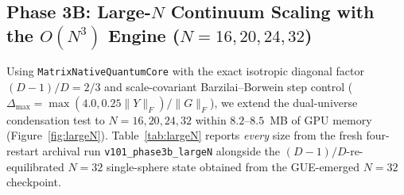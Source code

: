 \documentclass[11pt,a4paper]{article}
\begin{document}
\subsection{Phase 3B: Large-$N$ Continuum Scaling with the $O(N^3)$ Engine ($N = 16, 20, 24, 32$)}
\label{sec:exp_largeN}

Using \texttt{MatrixNativeQuantumCore} with the exact isotropic diagonal factor $(D-1)/D = 2/3$ and scale-covariant Barzilai--Borwein step control ($\Delta_{\max} = \max(4.0, 0.25\|Y\|_F)/\|G\|_F$), we extend the dual-universe condensation test to $N = 16, 20, 24, 32$ within $8.2$--$8.5$~MB of GPU memory (Figure~\ref{fig:largeN}). Table~\ref{tab:largeN} reports \emph{every} size from the fresh four-restart archival run \texttt{v101\_phase3b\_largeN} alongside the $(D-1)/D$-re-equilibrated $N=32$ single-sphere state obtained from the GUE-emerged $N=32$ checkpoint.
\end{document}
